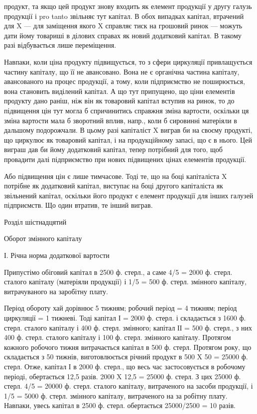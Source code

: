 \parcont{}  %
продукт, та якщо цей продукт знову входить як елемент продукції у
другу галузь продукції і pro tanto звільняє тут капітал. В обох випадках
капітал, втрачений для X — для заміщення якого X справляє тиск на грошовий
ринок — можуть дати йому товариші в ділових справах як новий
додатковий капітал. В такому разі відбувається лише переміщення.

Навпаки, коли ціна продукту підвищується, то з сфери циркуляції
привлащується частину капіталу, що її не авансовано. Вона не є
органічна частина капіталу, авансованого на процес продукції, а тому,
коли підприємство не поширюється, вона становить виділений капітал.
А що тут припущено, що ціни елементів продукту дано раніш, ніж він
як товаровий капітал вступив на ринок, то до підвищення цін тут могла б
спричинитись справжня зміна вартости, оскільки ця зміна вартости мала б
зворотний вплив, напр., коли б сировинні матеріяли в дальшому
подорожчали. В цьому разі капіталіст X виграв би на своєму продукті,
що циркулює як товаровий капітал, і на продукційному запасі, що є в
нього. Цей виграш дав би йому додатковий капітал, тепер потрібний для
того, щоб провадити далі підприємство при нових підвищених цінах елементів
продукції.

Або підвищення цін є лише тимчасове. Тоді те, що на боці капіталіста
X потрібне як додатковий капітал, виступає на боці другого капіталіста
як звільнений капітал, оскільки його продукт є елемент продукції
для інших галузей підприємств. Що один втратив, те інший виграв.

Розділ шістнадцятий

Оборот змінного капіталу

І. Річна норма додаткової вартости

Припустімо обіговий капітал в 2500 ф. стерл., а саме 4/5 = 2000 ф.
стерл. сталого капіталу (матеріяли продукції) і 1/5 = 500 ф. стерл. змінного
капіталу, витрачуваного на заробітну плату.

Період обороту хай дорівнює 5 тижням; робочий період = 4 тижням;
період циркуляції = 1 тижневі. Тоді капітал І = 2000 ф. стерл. і складається
з 1600 ф. стерл. сталого капіталу і 400 ф. стерл. змінного; капітал
ІІ = 500 ф. стерл., з них 400 ф. стерл. сталого капіталу і 100 ф.
стерл. змінного капіталу. Протягом кожного робочого тижня витрачається
капітал в 500 ф. стерл. Протягом року, що складається з 50 тижнів,
виготовлюється річний продукт в 500 X 50 = 25000 ф. стерл. Отже, капітал
І в 2000 ф. стерл., що весь час застосовується в робочому періоді,
обертається 12,5 разів. 2000 X 12,5 = 25000 ф. стерл. З цих 25000 ф.
стерл. 4/5 = 20000 ф. стерл. сталого капіталу, витраченого на засоби
продукції, і 1/5 = 5000 ф. стерл. змінного капіталу, витраченого на за
робітну плату. Навпаки, увесь капітал в 2500 ф. стерл. обертається
25000/2500 = 10 разів.

